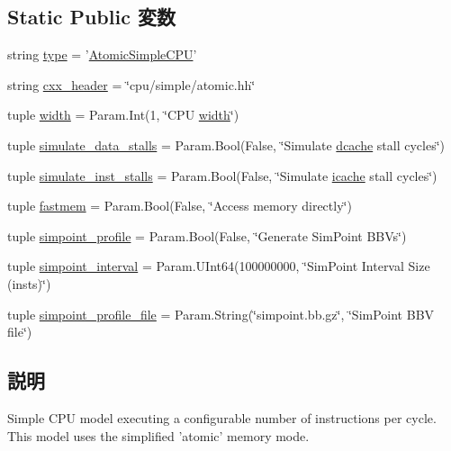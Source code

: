 \subsection*{Static Public 変数}
\begin{DoxyCompactItemize}
\item 
string \hyperlink{classAtomicSimpleCPU_1_1AtomicSimpleCPU_acce15679d830831b0bbe8ebc2a60b2ca}{type} = '\hyperlink{classAtomicSimpleCPU_1_1AtomicSimpleCPU}{AtomicSimpleCPU}'
\item 
string \hyperlink{classAtomicSimpleCPU_1_1AtomicSimpleCPU_a17da7064bc5c518791f0c891eff05fda}{cxx\_\-header} = \char`\"{}cpu/simple/atomic.hh\char`\"{}
\item 
tuple \hyperlink{classAtomicSimpleCPU_1_1AtomicSimpleCPU_a397bb3beea7b21f074bc75e1e71f132f}{width} = Param.Int(1, \char`\"{}CPU \hyperlink{classAtomicSimpleCPU_1_1AtomicSimpleCPU_a397bb3beea7b21f074bc75e1e71f132f}{width}\char`\"{})
\item 
tuple \hyperlink{classAtomicSimpleCPU_1_1AtomicSimpleCPU_a0ceb727c82a4dbf09a1d93010bde8419}{simulate\_\-data\_\-stalls} = Param.Bool(False, \char`\"{}Simulate \hyperlink{classBaseCPU_a14fe98d2073e51d9684da721ccee155d}{dcache} stall cycles\char`\"{})
\item 
tuple \hyperlink{classAtomicSimpleCPU_1_1AtomicSimpleCPU_a737869f6a14bf7548e535343572146f3}{simulate\_\-inst\_\-stalls} = Param.Bool(False, \char`\"{}Simulate \hyperlink{classBaseCPU_a6a2f1113123f35e7b40563253458e1bc}{icache} stall cycles\char`\"{})
\item 
tuple \hyperlink{classAtomicSimpleCPU_1_1AtomicSimpleCPU_ad79207d0fee050d6bbab51940ecf5af4}{fastmem} = Param.Bool(False, \char`\"{}Access memory directly\char`\"{})
\item 
tuple \hyperlink{classAtomicSimpleCPU_1_1AtomicSimpleCPU_adf636be6d74dd1575256658761a69c35}{simpoint\_\-profile} = Param.Bool(False, \char`\"{}Generate SimPoint BBVs\char`\"{})
\item 
tuple \hyperlink{classAtomicSimpleCPU_1_1AtomicSimpleCPU_a5337086882522ee045e8a0d0399f5ce0}{simpoint\_\-interval} = Param.UInt64(100000000, \char`\"{}SimPoint Interval Size (insts)\char`\"{})
\item 
tuple \hyperlink{classAtomicSimpleCPU_1_1AtomicSimpleCPU_ae342ee94ddfeda5ab3d190d419aeb920}{simpoint\_\-profile\_\-file} = Param.String(\char`\"{}simpoint.bb.gz\char`\"{}, \char`\"{}SimPoint BBV file\char`\"{})
\end{DoxyCompactItemize}


\subsection{説明}
\begin{DoxyVerb}Simple CPU model executing a configurable number of
instructions per cycle. This model uses the simplified 'atomic'
memory mode.\end{DoxyVerb}
 

